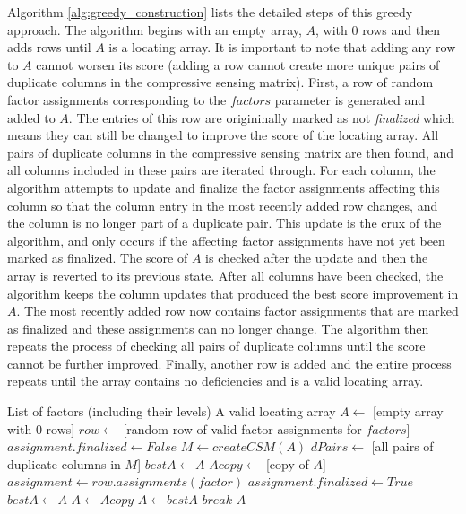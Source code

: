 Algorithm \ref{alg:greedy_construction} lists the detailed steps of this greedy approach.
The algorithm begins with an empty array, $A$, with 0 rows and then adds rows until $A$ is a locating array.
It is important to note that adding any row to $A$ cannot worsen its score (adding a row cannot create more unique pairs of duplicate columns in the compressive sensing matrix).
First, a row of random factor assignments corresponding to the $\mathit{factors}$ parameter is generated and added to $A$.
The entries of this row are origininally marked as not \textit{finalized} which means they can still be changed to improve the score of the locating array.
All pairs of duplicate columns in the compressive sensing matrix are then found, and all columns included in these pairs are iterated through.
For each column, the algorithm attempts to update and finalize the factor assignments affecting this column so that the column entry in the most recently added row changes, and the column is no longer part of a duplicate pair.
This update is the crux of the algorithm, and only occurs if the affecting factor assignments have not yet been marked as finalized.
The score of $A$ is checked after the update and then the array is reverted to its previous state.
After all columns have been checked, the algorithm keeps the column updates that produced the best score improvement in $A$.
The most recently added row now contains factor assignments that are marked as finalized and these assignments can no longer change.
The algorithm then repeats the process of checking all pairs of duplicate columns until the score cannot be further improved.
Finally, another row is added and the entire process repeats until the array contains no deficiencies and is a valid locating array.

\begin{algorithm}[pthb]
\caption{$\mathrm{Greedy\_Construction}(\mathit{factors})$}
\label{alg:greedy_construction}

\begin{algorithmic}[1]
\REQUIRE List of factors (including their levels)
\ENSURE A valid locating array
\STATE $A \gets$ [empty array with 0 rows]
	\STATE $row \gets$ [random row of valid factor assignments for $factors$]
		\STATE $assignment.finalized \gets False$
	\ENDFOR
		\STATE $M \gets createCSM(A)$
		\STATE $dPairs \gets$ [all pairs of duplicate columns in $M$]
		\STATE $bestA \gets A$
		 \label{line:time_bound}
				\STATE $Acopy \gets$ [copy of $A$]
					\STATE $assignment \gets row.assignments(factor)$
						\STATE $assignment.finalized \gets True$
					\ENDIF
				\ENDFOR
					\STATE $bestA \gets A$
				\ENDIF
				\STATE $A \gets Acopy$
			\ENDFOR
		\ENDFOR
			\STATE $A \gets bestA$
		\ELSE
			\STATE $break$
		\ENDIF
	\ENDWHILE
\ENDWHILE
\RETURN $A$
\end{algorithmic}
\end{algorithm}


